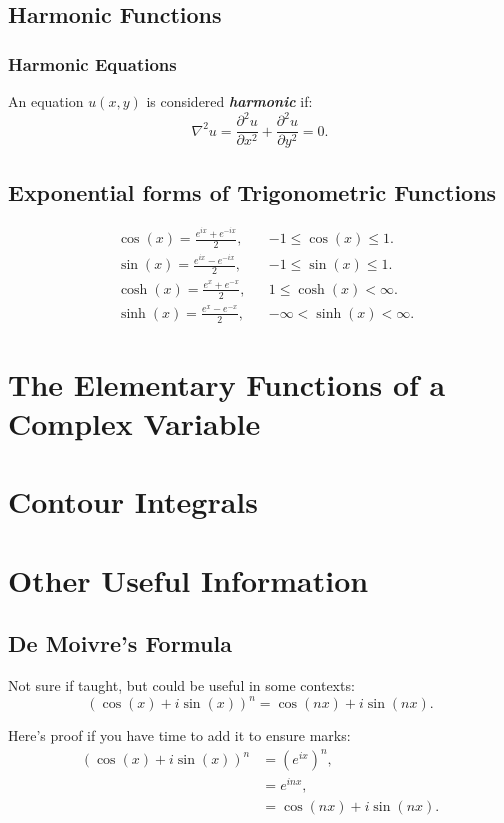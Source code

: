 \documentclass{article}
\begin{document}
\subsection{Harmonic Functions}
\subsubsection{Harmonic Equations}
An equation $u(x,y)$ is considered \textbf{\textit{harmonic}} if:
\begin{equation}
    \nabla^2u = \frac{\partial^2u}{\partial x^2}+\frac{\partial^2u}{\partial y^2} =0.
\end{equation}

\subsection{Exponential forms of Trigonometric Functions}
\begin{align}
    &\cos(x)=\frac{e^{ix}+e^{-ix}}{2}, && -1\leq\cos(x)\leq 1.\\
    &\sin(x)=\frac{e^{ix}-e^{-ix}}{2}, && -1\leq\sin(x)\leq 1.\\
    &\cosh(x)=\frac{e^{x}+e^{-x}}{2}, && 1\leq \cosh(x)<\infty.\\
    &\sinh(x)=\frac{e^{x}-e^{-x}}{2}, && -\infty<\sinh(x)<\infty.
\end{align}

\section{The Elementary Functions of a Complex Variable}
\section{Contour Integrals}
\section{Other Useful Information}

\subsection{De Moivre's Formula}
Not sure if taught, but could be useful in some contexts:
\begin{equation}
    (\cos(x) + i\sin(x))^n = \cos(nx) + i\sin(nx).
\end{equation}

Here's proof if you have time to add it to ensure marks:
\begin{align}
    (\cos(x) + i\sin(x))^n &= (e^{ix})^n,\\
    &=e^{inx},\\
    &=\cos(nx) + i\sin(nx).
\end{align}
\end{document}
